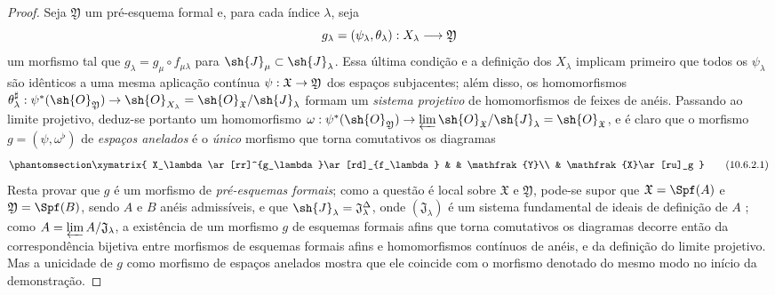 \documentclass[oneside]{amsart}
\makeatletter
\newcommand{\ega@arrow}[2]{\mathchoice{#1}{#2}{#2}{#2}}
\renewcommand{\to}{\ega@arrow{\longrightarrow}{\rightarrow}}
\let\EGAOriginalLabel\label
\renewcommand{\label}[1]{\phantomsection\EGAOriginalLabel{#1}}
\makeatother
\begin{document}
\begin{proof}
Seja $\mathfrak{Y}$ um pré-esquema formal e, para cada índice $\lambda$, seja
\[
  g_\lambda=(\psi_\lambda,\theta_\lambda):X_\lambda\to\mathfrak{Y}
\]
um morfismo tal que $g_\lambda=g_\mu\circ f_{\mu\lambda}$ para $\sh{J}_\mu\subset\sh{J}_\lambda$.
Essa última condição e a definição dos $X_\lambda$ implicam primeiro que todos os $\psi_\lambda$ são idênticos a uma mesma aplicação contínua $\psi:\mathfrak{X}\to\mathfrak{Y}$ dos espaços subjacentes; além disso, os homomorfismos $\theta_\lambda^\sharp:\psi^*(\sh{O}_\mathfrak{Y})\to\sh{O}_{X_\lambda}=\sh{O}_\mathfrak{X}/\sh{J}_\lambda$ formam um \emph{sistema projetivo} de homomorfismos de feixes de anéis.
Passando ao limite projetivo, deduz-se portanto um homomorfismo $\omega:\psi^*(\sh{O}_\mathfrak{Y})\to\varprojlim\sh{O}_\mathfrak{X}/\sh{J}_\lambda=\sh{O}_\mathfrak{X}$, e é claro que o morfismo $g=(\psi,\omega^\flat)$ de \emph{espaços anelados} é o \emph{único} morfismo que torna comutativos os diagramas
\[
\label{I.10.6.2.1}
  \xymatrix{
    X_\lambda\ar[rr]^{g_\lambda}\ar[rd]_{f_\lambda} & &
    \mathfrak{Y}\\
    & \mathfrak{X}\ar[ru]_g
  }
  \tag{10.6.2.1}
\]
Resta provar que $g$ é um morfismo de \emph{pré-esquemas formais}; como a questão é local sobre $\mathfrak{X}$ e $\mathfrak{Y}$, pode-se supor que $\mathfrak{X}=\Spf(A)$ e $\mathfrak{Y}=\Spf(B)$, sendo $A$ e $B$ anéis admissíveis, e que $\sh{J}_\lambda=\mathfrak{J}_\lambda^\Delta$, onde $(\mathfrak{J}_\lambda)$ é um sistema fundamental de ideais de definição de $A$ ; como $A=\varprojlim A/\mathfrak{J}_\lambda$, a existência de um morfismo $g$ de esquemas formais afins que torna comutativos os diagramas  decorre então da correspondência bijetiva  entre morfismos de esquemas formais afins e homomorfismos contínuos de anéis, e da definição do limite projetivo.
Mas a unicidade de $g$ como morfismo de espaços anelados mostra que ele coincide com o morfismo denotado do mesmo modo no início da demonstração.
\end{proof}
\end{document}
